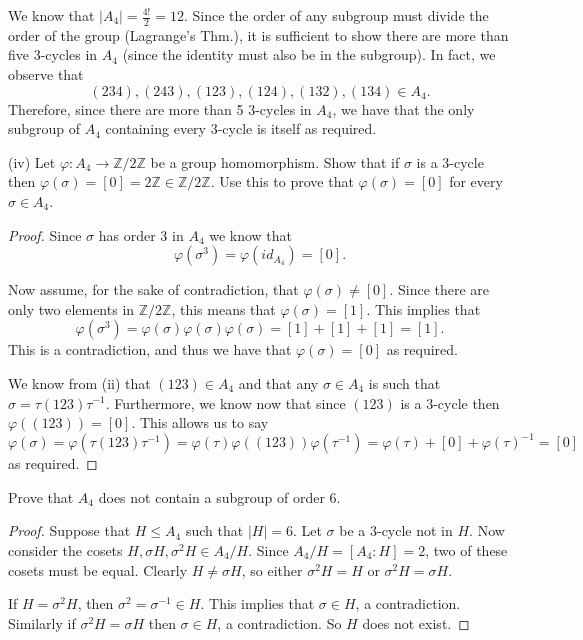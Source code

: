 \documentclass{article}
\newcommand{\Z}{\mathbb{Z}}
\newenvironment{hwproof}[1]
{
    #1
    \begin{proof}
}{
    \end{proof}
}
\begin{document}
We know that $|A_4| = \frac{4!}{2} = 12$. Since the order of any subgroup must
divide the order of the group (Lagrange's Thm.), it is sufficient to show there
are more than five 3-cycles in $A_4$ (since the identity must also be in the subgroup).
In fact, we observe that
\begin{equation*}
    (234), (243), (123), (124),(132),(134) \in A_4.
\end{equation*}
Therefore, since there are more than 5 3-cycles in $A_4$, we have that the only
subgroup of $A_4$ containing every 3-cycle is itself as required.

\begin{hwproof}
    {
        (iv) Let $\varphi: A_4 \to \Z / 2\Z$ be a group homomorphism. Show that if
        $\sigma$ is a 3-cycle then $\varphi(\sigma) = [0] = 2\Z \in \Z / 2\Z$.
        Use this to prove that $\varphi(\sigma) = [0]$ for every
        $\sigma \in A_4$.
    }

    Since $\sigma$ has order 3 in $A_4$ we know that
    \begin{equation*}
        \varphi(\sigma^3) = \varphi(id_{A_4}) = [0].
    \end{equation*}

    Now assume, for the sake of contradiction, that $\varphi(\sigma) \neq [0]$.
    Since there are only two elements in $\Z / 2\Z$, this means that
    $\varphi(\sigma) = [1]$. This implies that
    \begin{equation*}
        \varphi(\sigma^3) = \varphi(\sigma)\varphi(\sigma)\varphi(\sigma)
        = [1] + [1] + [1] = [1].
    \end{equation*}
    This is a contradiction, and thus we have that $\varphi(\sigma) = [0]$
    as required.

    We know from (ii) that $(123) \in A_4$ and that any $\sigma \in A_4$ is
    such that $\sigma = \tau (123) \tau^{-1}$. Furthermore, we know now that
    since $(123)$ is a 3-cycle then $\varphi((123)) = [0]$. This allows us to
    say
    \begin{equation*}
        \varphi(\sigma) = \varphi(\tau (123) \tau^{-1})
        = \varphi(\tau) \varphi((123)) \varphi(\tau^{-1})
        = \varphi(\tau) + [0] + \varphi(\tau)^{-1}
        = [0]
    \end{equation*}
    as required.
\end{hwproof}

\begin{hwproof}
    {
        Prove that $A_4$ does not contain a subgroup of order 6.
    }
    Suppose that $H \leq A_4$ such that $|H| = 6$. Let $\sigma$ be a 3-cycle
    not in $H$. Now consider the cosets $H, \sigma H, \sigma^2 H \in A_4 / H$.
    Since $A_4 / H = [A_4 : H] = 2$, two of these cosets must be equal.
    Clearly $H \neq \sigma H$, so either $\sigma^2 H = H$ or $\sigma^2 H = \sigma H$.

    If $H = \sigma^2 H$, then $\sigma^2 = \sigma^{-1} \in H$. This implies that
    $\sigma \in H$, a contradiction. Similarly if $\sigma^2 H = \sigma H$ then
    $\sigma \in H$, a contradiction. So $H$ does not exist.

\end{hwproof}
\end{document}
